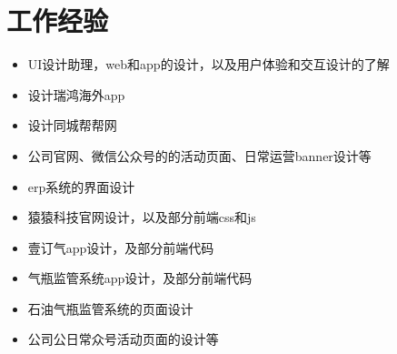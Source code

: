 \documentclass{resume}
\begin{document}
\section{工作经验}
\begin{itemize}
  \item UI设计助理，web和app的设计，以及用户体验和交互设计的了解
\end{itemize}
\begin{itemize}
  \item 设计瑞鸿海外app
  \item 设计同城帮帮网
  \item 公司官网、微信公众号的的活动页面、日常运营banner设计等
\end{itemize}
\begin{itemize}
  \item erp系统的界面设计
  \item 猿猿科技官网设计，以及部分前端css和js
\end{itemize}
\begin{itemize}
  \item 壹订气app设计，及部分前端代码
  \item 气瓶监管系统app设计，及部分前端代码
  \item 石油气瓶监管系统的页面设计
  \item 公司公日常众号活动页面的设计等
\end{itemize}
\end{document}
